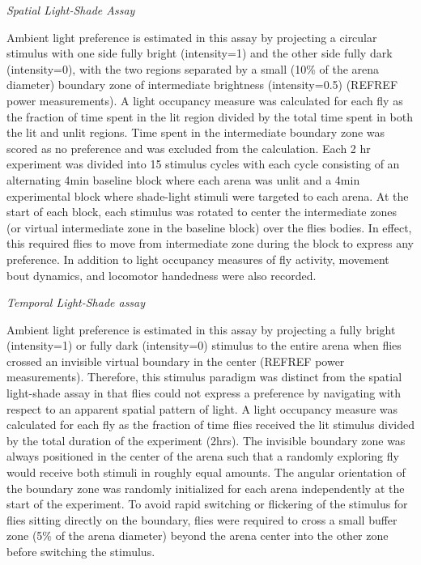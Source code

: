 \documentclass[12pt,letterpaper]{article}
\begin{document}
\textit{Spatial Light-Shade Assay}

Ambient light preference is estimated in this assay by projecting a circular stimulus with one side fully bright (intensity=1) and the other side fully dark (intensity=0), with the two regions separated by a small (10\% of the arena diameter) boundary zone of intermediate brightness (intensity=0.5) (REFREF power measurements). A light occupancy measure was calculated for each fly as the fraction of time spent in the lit region divided by the total time spent in both the lit and unlit regions. Time spent in the intermediate boundary zone was scored as no preference and was excluded from the calculation. Each 2 hr experiment was divided into 15 stimulus cycles with each cycle consisting of an alternating 4min baseline block where each arena was unlit and a 4min experimental block where shade-light stimuli were targeted to each arena. At the start of each block, each stimulus was rotated to center the intermediate zones (or virtual intermediate zone in the baseline block) over the flies bodies. In effect, this required flies to move from intermediate zone during the block to express any preference. In addition to light occupancy measures of fly activity, movement bout dynamics, and locomotor handedness were also recorded.

\textit{Temporal Light-Shade assay}

Ambient light preference is estimated in this assay by projecting a fully bright (intensity=1) or fully dark (intensity=0) stimulus to the entire arena when flies crossed an invisible virtual boundary in the center (REFREF power measurements). Therefore, this stimulus paradigm was distinct from the spatial light-shade assay in that flies could not express a preference by navigating with respect to an apparent spatial pattern of light. A light occupancy measure was calculated for each fly as the fraction of time flies received the lit stimulus divided by the total duration of the experiment (2hrs). The invisible boundary zone was always positioned in the center of the arena such that a randomly exploring fly would receive both stimuli in roughly equal amounts. The angular orientation of the boundary zone was randomly initialized for each arena independently at the start of the experiment. To avoid rapid switching or flickering of the stimulus for flies sitting directly on the boundary, flies were required to cross a small buffer zone (5\% of the arena diameter) beyond the arena center into the other zone before switching the stimulus.
\end{document}
